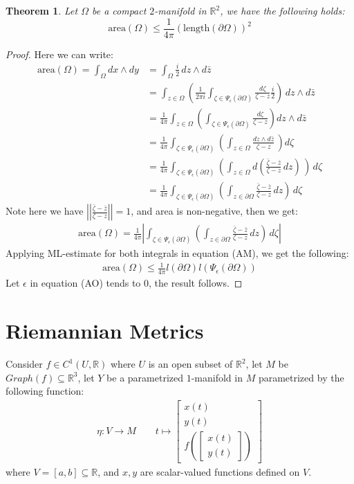 \documentclass[11pt,oneside]{book}
\theoremstyle{break}
\theoremstyle{break}
\newtheorem{thm}{Theorem}[section]
\newcommand{\R}{\mathbb{R}}
\newcommand{\bmat}[1]{\begin{bmatrix} #1 \end{bmatrix}}
\begin{document}
\begin{thm}
Let $\Omega$ be a compact $2$-manifold in $\R^2$, we have the following holds:
$$\text{area}(\Omega) \leq \frac{1}{4\pi}\left( \text{length}(\partial \Omega)\right)^2$$
\end{thm}
\begin{proof}
Here we can write:
\begin{align*}
\text{area}(\Omega) = \int_{\Omega} dx\wedge dy &= \int_{\Omega} \frac{i}{2}\, dz \wedge d\bar{z}\\
&= \int_{z \in \Omega}\left( \frac{1}{2\pi i}\int_{\zeta \in \Psi_{\epsilon}(\partial \Omega)} \frac{d\zeta}{\zeta - z} \frac{i}{2}\right)\, dz \wedge d\bar{z} \\
&= \frac{1}{4\pi}\int_{z\in \Omega}\left(\int_{\zeta \in \Psi_{\epsilon}(\partial \Omega)} \frac{d\zeta}{\zeta - z} \right) dz\wedge d\bar{z}\\
&= \frac{1}{4\pi}\int_{\zeta \in \Psi_{\epsilon}(\partial \Omega)}\left( \int_{z \in \Omega} \frac{dz \wedge d\bar{z}}{\zeta - z}\, \right)d\zeta \\
&= \frac{1}{4\pi}\int_{\zeta \in \Psi_{\epsilon}(\partial \Omega)}\left( \int_{z \in \Omega} d\left(\frac{\bar{\zeta}-\bar{z}}{\zeta - z}\,dz\right)\, \right)\,d\zeta \\
&= \frac{1}{4\pi} \int_{\zeta \in \Psi_\epsilon(\partial \Omega)} \left( \int_{z\in \partial\Omega} \frac{\bar{\zeta} - \bar{z}}{\zeta - z}\, dz\right)\, d\zeta
\end{align*}
Note here we have $\left|\left|\frac{\bar{\zeta} - \bar{z}}{\zeta - z} \right|\right|  = 1$, and area is non-negative, then we get:
\begin{align*}
\text{area}(\Omega) = \frac{1}{4\pi}\left| \int_{\zeta \in \Psi_\epsilon(\partial \Omega)} \left( \int_{z\in \partial\Omega} \frac{\bar{\zeta} - \bar{z}}{\zeta - z}\, dz\right)\, d\zeta \right| \tag{AM}
\end{align*}
Applying ML-estimate for both integrals in equation (AM), we get the following:
\begin{align*}
\text{area}(\Omega) \leq \frac{1}{4\pi} l(\partial \Omega) l(\Psi_{\epsilon} (\partial \Omega)) \tag{AO}
\end{align*}
Let $\epsilon$ in equation (AO) tends to $0$, the result follows.
\end{proof}

\newpage
\section[Riemannian Metrics]{\color{red}Riemannian Metrics\color{black}}
Consider $f \in C^1(U,\R)$ where $U$ is an open subset of $\R^2$, let $M$
be $Graph(f) \subseteq \R^3$, let $Y$ be a parametrized $1$-manifold in $M$ parametrized by the following function:
\begin{align*}
\eta: V \to M \qquad t\mapsto \bmat{x(t)\\ y(t) \\ f\left(\bmat{x(t)\\y(t)}\right)}
\end{align*}
where $V=[a,b]\subseteq \R$, and $x,y$ are scalar-valued functions defined on $V$.
\end{document}
